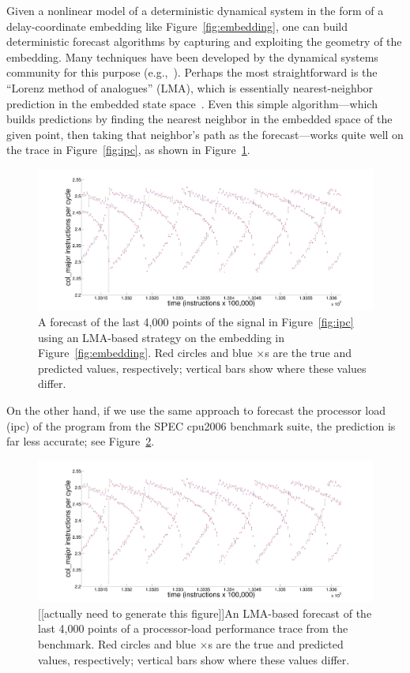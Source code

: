 Given a nonlinear model of a deterministic dynamical system in the
form of a delay-coordinate embedding like Figure~\ref{fig:embedding},
one can build deterministic forecast algorithms by capturing and
exploiting the geometry of the embedding.  Many techniques have been
developed by the dynamical systems community for this purpose
(e.g.,~\cite{weigend-book,casdagli-eubank92,Smith199250}).  Perhaps the most straightforward
is the ``Lorenz method of analogues'' (LMA), which is essentially
nearest-neighbor prediction in the embedded state
space~\cite{lorenz-analogues}.  Even this simple algorithm---which
builds predictions by finding the nearest neighbor in the embedded
space of the given point, then taking that neighbor's path as the
forecast---works quite well on the trace in Figure~\ref{fig:ipc}, as
shown in Figure~\ref{fig:lmacol}.
%
\begin{figure}[htbp]
  \centering
   \includegraphics[width=\textwidth]{figs/colPredShortTS}
    \caption{A forecast of the last 4,000 points of the signal in
      Figure~\ref{fig:ipc} using an LMA-based strategy on the
      embedding in Figure~\ref{fig:embedding}.  Red circles and blue
      $\times$s are the true and predicted values, respectively;
      vertical bars show where these values differ.}
\label{fig:lmacol}
\end{figure}
%
On the other hand, if we use the same approach to forecast the
processor load (ipc) of the \gcc program from the SPEC cpu2006 benchmark suite, the
prediction is far less accurate; see Figure~\ref{fig:lmagcc}.

\begin{figure}[htbp]
  \centering
    \includegraphics[width=\textwidth]{figs/colPredShortTS}
     \caption{{\color{red} [[actually need to generate this figure]]}An LMA-based forecast of the last 4,000 points of a
       processor-load performance trace from the \gcc
       benchmark.  Red circles and blue $\times$s are the true and
       predicted values, respectively; vertical bars show where these
       values differ.}
\label{fig:lmagcc}
\end{figure}

